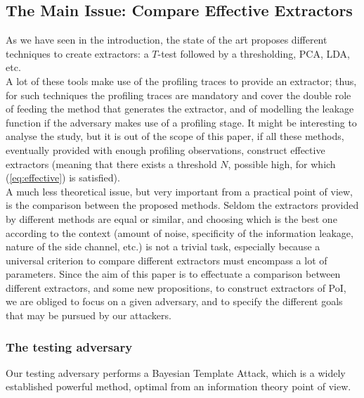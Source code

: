 \subsection{The Main Issue:  Compare Effective Extractors}


As we have seen in the introduction, the state of the art proposes different techniques to create extractors:  a $T$-test followed by a thresholding, PCA, LDA, etc.\\
A lot of these tools make use of the profiling traces to provide an extractor; thus, for such techniques the profiling traces are mandatory and cover the double role of feeding the method that generates the extractor, and of modelling the leakage function if the adversary makes use of a profiling stage. It might be interesting to analyse the study, but it is out of the scope of this paper, if all these methods, eventually provided with enough profiling observations, construct effective extractors (meaning that there exists a threshold $N$, possible high, for which (\ref{eq:effective}) is satisfied).\\

A much less theoretical issue, but very important from a practical point of view, is the comparison between the proposed methods. Seldom the extractors provided by different methods are equal or similar, and choosing which is the best one according to the context (amount of noise, specificity of the information leakage, nature of the side channel, etc.) is not a trivial task, especially because a universal criterion to compare different extractors must encompass a lot of parameters. 
Since the aim of this paper is to effectuate a comparison between different extractors, and some new propositions, to construct extractors of PoI, we are obliged to focus on a given adversary, and to specify the different goals that may be pursued by our attackers.
\subsubsection{The testing adversary} Our testing adversary performs a Bayesian Template Attack, which is a widely established powerful method, optimal from an information theory point of view. 


